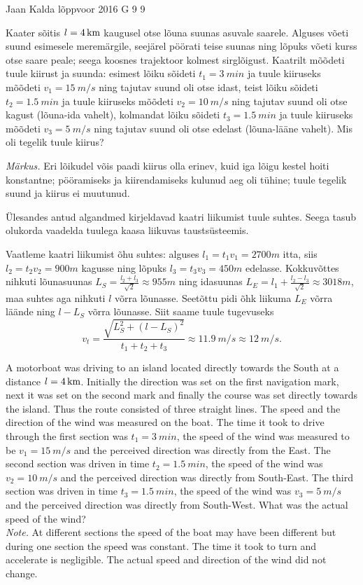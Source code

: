 {Jaan Kalda} %
{lõppvoor} %
{2016} %
{G 9} %
{9} %
{
\ifStatement
Kaater sõitis $l=\SI 4{km}$ kaugusel otse lõuna suunas asuvale saarele. 
Alguses võeti suund esimesele meremärgile, seejärel pöörati teise suunas ning lõpuks võeti kurss otse saare peale; seega koosnes trajektoor kolmest sirglõigust. Kaatrilt mõõdeti tuule kiirust ja suunda: esimest lõiku sõideti $t_1=\SI{3}{min}$ ja tuule kiiruseks mõõdeti $v_1=\SI{15}{m/s}$ ning tajutav suund oli otse idast, teist lõiku sõideti $t_2=\SI{1,5}{min}$ ja tuule kiiruseks mõõdeti $v_2=\SI{10}{m/s}$ ning tajutav suund oli otse kagust (lõuna-ida vahelt), kolmandat lõiku sõideti $t_3=\SI{1,5}{min}$ ja tuule kiiruseks mõõdeti $v_3=\SI{5}{m/s}$ ning tajutav suund oli otse edelast (lõuna-lääne vahelt). Mis oli tegelik tuule kiirus?

\emph{Märkus.} Eri lõikudel võis paadi kiirus olla erinev, kuid iga lõigu kestel hoiti konstantne; pööramiseks ja kiirendamiseks kulunud aeg oli tühine; tuule tegelik suund ja kiirus ei muutunud. 
\fi


\ifHint
Ülesandes antud algandmed kirjeldavad kaatri liikumist tuule suhtes. Seega tasub olukorda vaadelda tuulega kaasa liikuvas taustsüsteemis.
\fi


\ifSolution
Vaatleme kaatri liikumist õhu suhtes: alguses $l_1=t_1v_1=\SI{2700}m$ itta, siis $l_2=t_2v_2=\SI{900}m$ kagusse
ning lõpuks $l_3=t_3v_3=\SI{450}m$ edelasse. Kokkuvõttes nihkuti lõunasuunas $L_S=\frac{l_2+l_3}{\sqrt 2}\approx \SI{955}m$ ning idasuunas $L_E=l_1+\frac{l_2-l_3}{\sqrt 2}\approx \SI{3018}m$, maa suhtes aga nihkuti $l$ võrra lõunasse. Seetõttu pidi õhk liikuma $L_E$ võrra läände ning $l-L_S$ võrra lõunasse. Siit saame tuule tugevuseks 
$$v_t=\frac{\sqrt{L_S^2+(l-L_S)^2}}{t_1+t_2+t_3}\approx \SI{11.9}{m/s}\approx \SI{12}{m/s}.$$ 
\fi


\ifEngStatement
A motorboat was driving to an island located directly towards the South at a distance $l=\SI 4{km}$. Initially the direction was set on the first navigation mark, next it was set on the second mark and finally the course was set directly towards the island. Thus the route consisted of three straight lines. The speed and the direction of the wind was measured on the boat. The time it took to drive through the first section was $t_1=\SI{3}{min}$, the speed of the wind was measured to be $v_1=\SI{15}{m/s}$ and the perceived direction was directly from the East. The second section was driven in time $t_2=\SI{1,5}{min}$, the speed of the wind was $v_2=\SI{10}{m/s}$ and the perceived direction was directly from South-East. The third section was driven in time $t_3=\SI{1,5}{min}$, the speed of the wind was $v_3=\SI{5}{m/s}$ and the perceived direction was directly from South-West. What was the actual speed of the wind?\\
\emph{Note.} At different sections the speed of the boat may have been different but during one section the speed was constant. The time it took to turn and accelerate is negligible. The actual speed and direction of the wind did not change.
\fi


}
